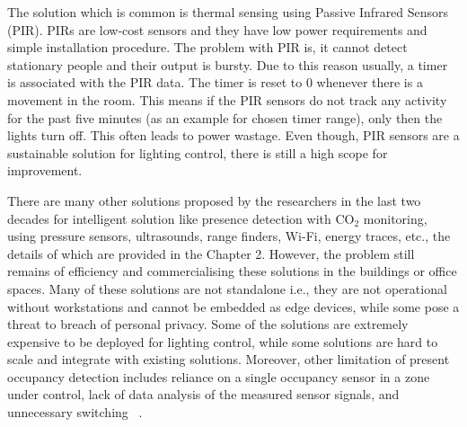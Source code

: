 The solution which is common is thermal sensing using Passive Infrared Sensors (PIR). PIRs are low-cost sensors and they have low power requirements and simple installation procedure. The problem with PIR is, it cannot detect stationary people and their output is bursty. Due to this reason usually, a timer is associated with the PIR data. The timer is reset to 0 whenever there is a movement in the room. This means if the PIR sensors do not track any activity for the past five minutes (as an example for chosen timer range), only then the lights turn off. This often leads to power wastage. Even though, PIR sensors are a sustainable solution for lighting control, there is still a high scope for improvement.

There are many other solutions proposed by the researchers in the last two decades for intelligent solution like presence detection with CO$_{2}$ monitoring, using pressure sensors, ultrasounds, range finders, Wi-Fi, energy traces,  etc., the details of which are provided in the Chapter 2. However, the problem still remains of efficiency and commercialising these solutions in the buildings or office spaces. Many of these solutions are not standalone i.e., they are not operational without workstations and cannot be embedded as edge devices, while some pose a threat to breach of personal privacy. Some of the solutions are extremely expensive to be deployed for lighting control, while some solutions are hard to scale and integrate with existing solutions. Moreover, other limitation of present occupancy detection includes reliance on a single occupancy sensor in a zone under control, lack of data analysis of the measured sensor signals, and unnecessary switching ~\cite{dodier2006building}.
 

